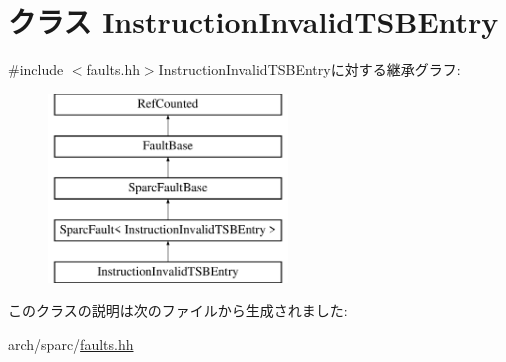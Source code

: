 \hypertarget{classSparcISA_1_1InstructionInvalidTSBEntry}{
\section{クラス InstructionInvalidTSBEntry}
\label{classSparcISA_1_1InstructionInvalidTSBEntry}
}


{\ttfamily \#include $<$faults.hh$>$}InstructionInvalidTSBEntryに対する継承グラフ:\begin{figure}[H]
\begin{center}
\leavevmode
\includegraphics[height=5cm]{classSparcISA_1_1InstructionInvalidTSBEntry}
\end{center}
\end{figure}


このクラスの説明は次のファイルから生成されました:\begin{DoxyCompactItemize}
\item 
arch/sparc/\hyperlink{arch_2sparc_2faults_8hh}{faults.hh}\end{DoxyCompactItemize}

